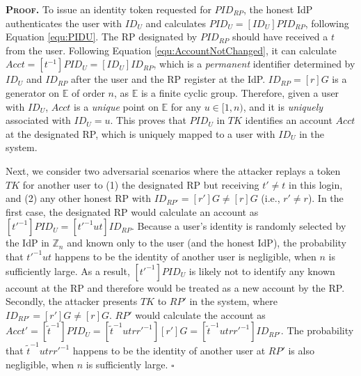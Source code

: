 \noindent\textbf{\textsc{Proof.}}
To issue an identity token requested for $PID_{RP}$, the honest IdP authenticates the user with $ID_U$ and calculates $PID_U = [ID_U]PID_{RP}$, following Equation \ref{equ:PIDU}. The RP designated by $PID_{RP}$ should have received a $t$ from the user. Following Equation \ref{equ:AccountNotChanged}, it can calculate $Acct = [t^{-1}]PID_{U} = [ID_U]ID_{RP}$, which is a \emph{permanent} identifier determined by $ID_U$ and $ID_{RP}$ after the user and the RP register at the IdP. $ID_{RP} = [r]G$ is a generator on $\mathbb{E}$ of order $n$, as $\mathbb{E}$ is a finite cyclic group. Therefore, given a user with $ID_U$, $Acct$ is a \emph{unique} point on $\mathbb{E}$ for any $u \in [1, n)$, and it is \emph{uniquely} associated with $ID_U=u$. 
This proves that $PID_U$ in $TK$ identifies an account $Acct$ at the designated RP, which is uniquely mapped to a user with $ID_U$ in the system.

Next, we consider two adversarial scenarios where the attacker replays a token $TK$ for another user to (1) the designated RP but receiving $t'\neq t$ in this login, and (2) any other honest RP with $ID_{RP'} = [r']G \neq [r]G$ (i.e., $r' \neq r$). In the first case, the designated RP would calculate an account as $[t'^{-1}]PID_U = [t'^{-1}ut]ID_{RP}$.
Because a user's identity is randomly selected by the IdP in $\mathbb{Z}_n$ and known only to the user (and the honest IdP), the probability that $t'^{-1}ut$ happens to be the identity of another user is negligible, when $n$ is sufficiently large. As a result, $[t'^{-1}]PID_U$ is likely not to identify any known account at the RP and therefore would be treated as a new account by the RP. 
Secondly, the attacker presents $TK$ to $RP'$ in the system, where $ID_{RP'} = [r']G \neq [r]G$. $RP'$ would calculate the account as $Acct' = [\tilde{t}^{-1}]PID_{U} = [\tilde{t}^{-1}utrr'^{-1}][r']G = [\tilde{t}^{-1}utrr'^{-1}]ID_{RP'}$. The probability that $\tilde{t}^{-1}utrr'^{-1}$ happens to be the identity of another user at $RP'$ is also negligible, when $n$ is sufficiently large. 
\hfill $\square$



